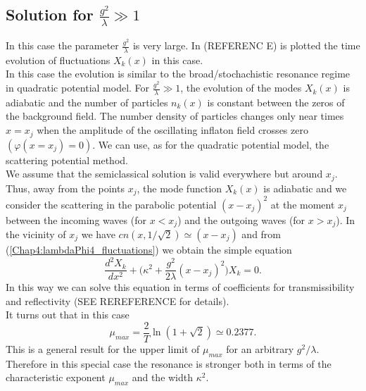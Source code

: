 \documentclass[11pt,a4paper,twoside]{book}
\begin{document}
\subsection{Solution for  $ \frac{g^{2}}{\lambda} \gg 1 $ }
In this case the parameter $ \frac{g^{2}}{\lambda}$ is very large. In (REFERENC E) is plotted the time evolution of fluctuations $ X_{k}(x) $ in this case. \\
In this case the evolution is similar to the broad/stochachistic resonance regime in quadratic potential model. For $ \frac{g^{2}}{\lambda} \gg 1 $, the evolution of the modes $ X_{k}(x) $ is adiabatic and the number of particles $ n_{k}(x) $ is constant between the zeros of the background field. The number density of particles changes only near times $ x=x_{j} $  when the amplitude of the oscillating inflaton field crosses zero $ (\varphi(x=x_{j})=0) $. We can use, as for the quadratic potential model, the scattering potential method.\\
We assume that the semiclassical solution is valid everywhere but around $ x_{j} $. Thus, away from the points $ x_{j} $, the mode function $ X_{k}(x) $ is adiabatic and we consider the scattering in the parabolic potential $ (x-x_{j})^{2} $ at the moment $ x_{j} $ between the incoming waves (for $ x<x_{j} $) and the outgoing waves (for $ x > x_{j} $). In the vicinity of $ x_{j} $ we have $ cn(x,1/\sqrt{2})\simeq (x-x_{j}) $ and from (\ref{Chap4:lambdaPhi4_fluctuations}) we obtain the simple equation
\begin{equation}
\label{Chap4:lambdaPhi4_simpleEquationAroundXj}
\frac{d^{2}X_{k}}{dx^{2}} + \Bigg(\kappa^{2} + \frac{g^{2}}{2\lambda}(x-x_{j})^{2}\Bigg) X_{k}= 0.
\end{equation}
In this way we can solve this equation in terms of coefficients  for transmissibility and reflectivity (SEE REREFERENCE for details).\\
It turns out that in this case
\begin{equation}
\label{Chap4:lambdaPhi4_umaxParabolicPotential}
\mu_{max} = \frac{2}{T}\ln(1+\sqrt{2}) \simeq 0.2377.
\end{equation}
This is a general result for the upper limit of $ \mu_{max} $ for an arbitrary $ g^{2}/\lambda $. Therefore in this special case the resonance is stronger both in terms of the characteristic exponent $ \mu_{max} $ and the width $ \kappa^{2} $.
\end{document}

